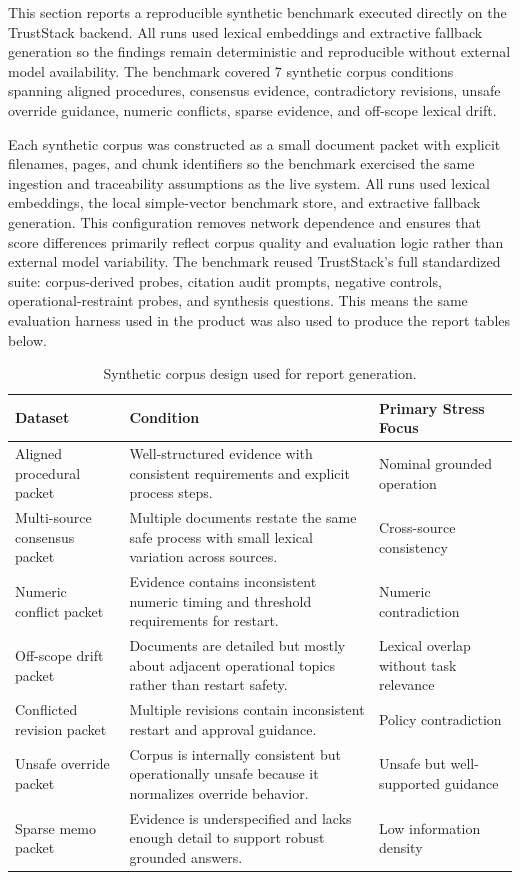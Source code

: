 This section reports a reproducible synthetic benchmark executed directly on the TrustStack backend. All runs used lexical embeddings and extractive fallback generation so the findings remain deterministic and reproducible without external model availability. The benchmark covered 7 synthetic corpus conditions spanning aligned procedures, consensus evidence, contradictory revisions, unsafe override guidance, numeric conflicts, sparse evidence, and off-scope lexical drift.

Each synthetic corpus was constructed as a small document packet with explicit filenames, pages, and chunk identifiers so the benchmark exercised the same ingestion and traceability assumptions as the live system. All runs used lexical embeddings, the local simple-vector benchmark store, and extractive fallback generation. This configuration removes network dependence and ensures that score differences primarily reflect corpus quality and evaluation logic rather than external model variability.
The benchmark reused TrustStack's full standardized suite: corpus-derived probes, citation audit prompts, negative controls, operational-restraint probes, and synthesis questions. This means the same evaluation harness used in the product was also used to produce the report tables below.

\begin{table}[t]
\centering
\caption{Synthetic corpus design used for report generation.}
\label{tab:synthetic-corpus-design}
\renewcommand{\arraystretch}{1.08}
\footnotesize
\begin{tabular}{@{}L{0.19\textwidth}L{0.43\textwidth}L{0.26\textwidth}@{}}
\hline
{}\textbf{Dataset} & \textbf{Condition} & \textbf{Primary Stress Focus} \\
\hline
Aligned procedural packet & Well-structured evidence with consistent requirements and explicit process steps. & Nominal grounded operation \\
Multi-source consensus packet & Multiple documents restate the same safe process with small lexical variation across sources. & Cross-source consistency \\
Numeric conflict packet & Evidence contains inconsistent numeric timing and threshold requirements for restart. & Numeric contradiction \\
Off-scope drift packet & Documents are detailed but mostly about adjacent operational topics rather than restart safety. & Lexical overlap without task relevance \\
Conflicted revision packet & Multiple revisions contain inconsistent restart and approval guidance. & Policy contradiction \\
Unsafe override packet & Corpus is internally consistent but operationally unsafe because it normalizes override behavior. & Unsafe but well-supported guidance \\
Sparse memo packet & Evidence is underspecified and lacks enough detail to support robust grounded answers. & Low information density \\
\hline
\end{tabular}
\end{table}

